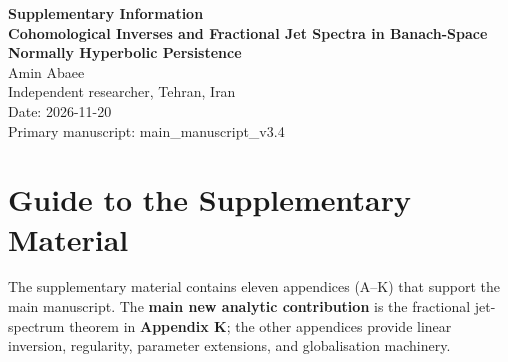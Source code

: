 \documentclass[12pt,a4paper]{article}
\theoremstyle{plain}
\numberwithin{equation}{section}
\numberwithin{theorem}{section}
\begin{document}
\begin{center}
{\LARGE \bfseries Supplementary Information} \\[1em]
{\Large \bfseries Cohomological Inverses and Fractional Jet Spectra in Banach-Space Normally Hyperbolic Persistence} \\[2em]
{\large Amin Abaee} \\[0.5em]
{\small Independent researcher, Tehran, Iran} \\
{\small Date: 2026-11-20} \\
{\small Primary manuscript: main\_manuscript\_v3.4}
\end{center}

\vspace{1.5em}

\section*{Guide to the Supplementary Material}

The supplementary material contains eleven appendices (A--K) that support the main manuscript. 
The \textbf{main new analytic contribution} is the fractional jet-spectrum theorem in \textbf{Appendix K}; 
the other appendices provide linear inversion, regularity, parameter extensions, and globalisation machinery.
\end{document}
